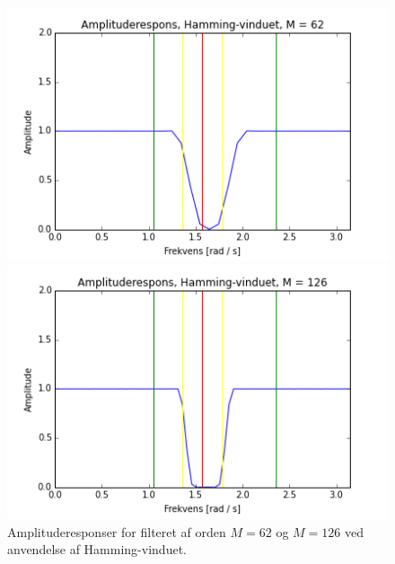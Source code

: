 \begin{figure}[H]
\begin{minipage}{0.49\textwidth}
\centering
\includegraphics[width=\textwidth]{figures/Filter/Filter_Hamming_62.png}
\end{minipage}
\begin{minipage}{0.49\textwidth}
\centering
\includegraphics[width=\textwidth]{figures/Filter/Filter_Hamming_126.png}
\end{minipage}
\caption{Amplituderesponser for filteret af orden $M = 62$ og $M=126$ ved anvendelse af Hamming-vinduet.}
\label{fig:amplituderespons_Hamming}
\end{figure}